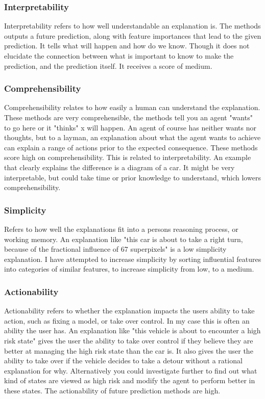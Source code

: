 \documentclass[UKenglish]{uiomasterthesis}
\begin{document}
\subsubsection{Interpretability}
Interpretability refers to how well understandable an explanation is. The methods outputs a future prediction, along with feature importances that lead to the given prediction. It tells what will happen and how do we know. Though it does not elucidate the connection between what is important to know to make the prediction, and the prediction itself. It receives a score of medium.

\subsubsection{Comprehensibility}
Comprehensibility relates to how easily a human can understand the explanation. These methods are very comprehensible, the methods tell you an agent "wants" to go here or it "thinks" x will happen. An agent of course has neither wants nor thoughts, but to a layman, an explanation about what the agent wants to achieve can explain a range of actions prior to the expected consequence. These methods score high on comprehensibility. This is related to interpretability. An example that clearly explains the difference is a diagram of a car. It might be very interpretable, but could take time or prior knowledge to understand, which lowers comprehensibility.

\subsubsection{Simplicity}
Refers to how well the explanations fit into a persons reasoning process, or working memory. An explanation like "this car is about to take a right turn, because of the fractional influence of 67 superpixels" is a low simplicity explanation. I have attempted to increase simplicity by sorting influential features into categories of similar features, to increase simplicity from low, to a medium. 

\subsubsection{Actionability}
Actionability refers to whether the explanation impacts the users ability to take action, such as fixing a model, or take over control. In my case this is often an ability the user has. An explanation like "this vehicle is about to encounter a high risk state" gives the user the ability to take over control if they believe they are better at managing the high risk state than the car is. It also gives the user the ability to take over if the vehicle decides to take a detour without a rational explanation for why. Alternatively you could investigate further to find out what kind of states are viewed as high risk and modify the agent to perform better in these states. The actionability of future prediction methods are high.
\end{document}
